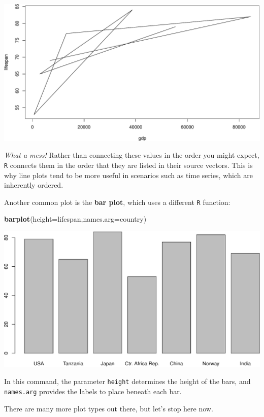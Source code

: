 \documentclass[
]{book}
\newenvironment{Shaded}{\begin{snugshade}}{\end{snugshade}}
\newcommand{\DataTypeTok}[1]{\textcolor[rgb]{0.13,0.29,0.53}{#1}}
\newcommand{\KeywordTok}[1]{\textcolor[rgb]{0.13,0.29,0.53}{\textbf{#1}}}
\newcommand{\NormalTok}[1]{#1}
\begin{document}
\includegraphics{figures/unnamed-chunk-97-1.pdf}

\emph{What a mess!} Rather than connecting these values in the order you might expect, \texttt{R} connects them in the order that they are listed in their source vectors. This is why line plots tend to be more useful in scenarios such as time series, which are inherently ordered.

Another common plot is the \textbf{bar plot}, which uses a different \texttt{R} function:

\begin{Shaded}
\begin{Highlighting}[]
\KeywordTok{barplot}\NormalTok{(}\DataTypeTok{height=}\NormalTok{lifespan,}\DataTypeTok{names.arg=}\NormalTok{country)}
\end{Highlighting}
\end{Shaded}

\includegraphics{figures/unnamed-chunk-98-1.pdf}

In this command, the parameter \texttt{height} determines the height of the bars, and \texttt{names.arg} provides the labels to place beneath each bar.

There are many more plot types out there, but let's stop here now.
\end{document}
